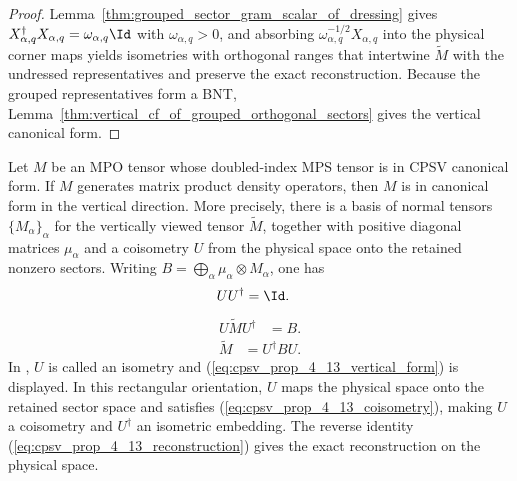 \begin{proof}\leanok
    Lemma~\ref{thm:grouped_sector_gram_scalar_of_dressing} gives
    $X_{\alpha,q}^\dagger X_{\alpha,q}=\omega_{\alpha,q}\Id$ with
    $\omega_{\alpha,q}>0$, and absorbing
    $\omega_{\alpha,q}^{-1/2}X_{\alpha,q}$ into the physical corner maps
    yields isometries with orthogonal ranges that intertwine
    $\widetilde M$ with the undressed representatives and preserve the exact
    reconstruction. Because the grouped representatives form a BNT,
    Lemma~\ref{thm:vertical_cf_of_grouped_orthogonal_sectors} gives the
    vertical canonical form.
\end{proof}

\begin{lemma}
    \label{thm:vertical_cf_of_cpsv_canonical_form}
    \leanok
    Let $M$ be an MPO tensor whose doubled-index MPS tensor is in
    CPSV canonical form. If $M$ generates matrix product density operators,
    then $M$ is in canonical form in the vertical direction. More precisely,
    there is a basis of normal tensors $\{M_\alpha\}_\alpha$ for the vertically
    viewed tensor $\widetilde M$, together with positive diagonal matrices
    $\mu_\alpha$ and a coisometry $U$ from the physical space onto the retained
    nonzero sectors. Writing
    $B=\bigoplus_\alpha\mu_\alpha\otimes M_\alpha$, one has
    \begin{align}
        UU^\dagger & =\Id.
        \label{eq:cpsv_prop_4_13_coisometry}
    \end{align}
    \begin{align}
        U\widetilde M U^\dagger & =B.
        \label{eq:cpsv_prop_4_13_vertical_form}
    \end{align}
    \begin{align}
        \widetilde M & =U^\dagger BU.
        \label{eq:cpsv_prop_4_13_reconstruction}
    \end{align}
    In \cite[Proposition~4.13]{Cirac2016MPDO_arXiv}, $U$ is called an isometry
    and (\ref{eq:cpsv_prop_4_13_vertical_form}) is displayed. In this rectangular
    orientation, $U$ maps the physical space onto the retained sector space and
    satisfies (\ref{eq:cpsv_prop_4_13_coisometry}), making $U$ a coisometry and
    $U^\dagger$ an isometric embedding. The reverse identity
    (\ref{eq:cpsv_prop_4_13_reconstruction}) gives the exact reconstruction
    on the physical space.
\end{lemma}

